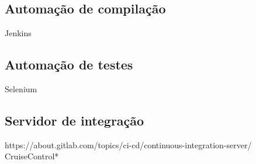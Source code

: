 

\subsection{Automação de compilação}
Jenkins

\subsection{Automação de testes}
Selenium

\subsection{Servidor de integração}
https://about.gitlab.com/topics/ci-cd/continuous-integration-server/
CruiseControl*


